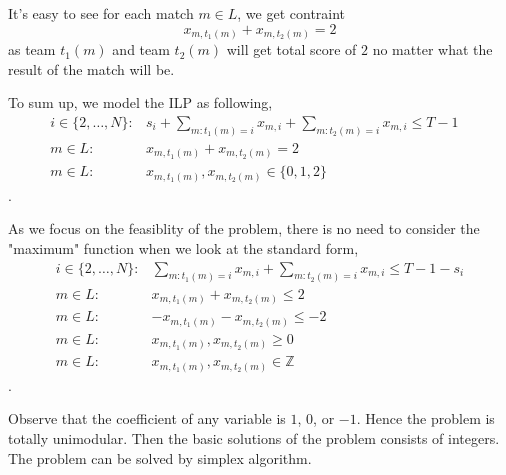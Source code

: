 \documentclass[10pt]{article}
\begin{document}
It's easy to see for each match $m \in L$, we get contraint
\[
  x_{m,t_1(m)} + x_{m,t_2(m)} = 2
\]
as team $t_1(m)$ and team $t_2(m)$ will get total score of $2$
no matter what the result of the match will be.

To sum up, we model the ILP as following,
\begin{align*}
  i \in \{2,\dots,N\}: & s_i+ \sum_{m:t_1(m)=i}x_{m,i} +
  \sum_{m:t_2(m)=i}x_{m,i} \leq T-1 & \\
  m \in L: & x_{m,t_1(m)} + x_{m,t_2(m)} = 2 & \\
  m \in L: & x_{m,t_1(m)},x_{m,t_2(m)} \in \{0,1,2\} &
\end{align*}.

As we focus on the feasiblity of the problem,
there is no need to consider the "maximum" function
when we look at the standard form,
\begin{align*}
  i \in \{2,\dots,N\}: &
  \sum_{m:t_1(m)=i}x_{m,i}+\sum_{m:t_2(m)=i}x_{m,i}
  \leq T-1-s_i \\
  m \in L: &
  x_{m,t_1(m)} + x_{m,t_2(m)} \leq 2 \\
  m \in L: &
  -x_{m,t_1(m)} - x_{m,t_2(m)} \leq -2 \\
  m \in L: &
  x_{m,t_1(m)},x_{m,t_2(m)} \geq 0 \\
  m \in L: &
  x_{m,t_1(m)},x_{m,t_2(m)} \in \mathbb{Z}
\end{align*}.

Observe that the coefficient of any variable is
$1$, $0$, or $-1$. 
Hence the problem is totally unimodular.
Then the basic solutions of the problem consists of integers. 
The problem can be solved by simplex algorithm.
\end{document}
